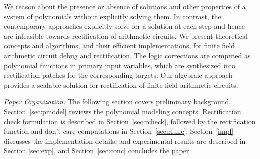 
{\red We reason about the presence or absence of solutions 
and other properties of a system of polynomials without explicitly solving them. 
In contrast, the contemporary approaches explicitly solve for a solution at 
each step and hence are infeasible towards rectification of arithmetic circuits.
We present theoretical concepts and algorithms, and their efficient implementations, 
for finite field arithmetic circuit debug and rectification. The logic corrections 
are computed as polynomial functions in primary input variables, which are synthesized 
into rectification patches for the corresponding targets. 
Our algebraic approach provides a scalable solution for rectification
of finite field arithmetic circuits.}

{\it Paper Organization:} The following section covers preliminary
background. Section~\ref{sec:pmodel} reviews the polynomial modeling
concepts. Rectification check formulation is described in
Section~\ref{sec:rcheck}, followed by the rectification function and
don't care computations in Section~\ref{sec:rfunc}. Section~\ref{impl}
discusses the implementation details, and experimental
results are described in Section \ref{sec:exp}, and
Section~\ref{sec:conc} concludes the paper. 